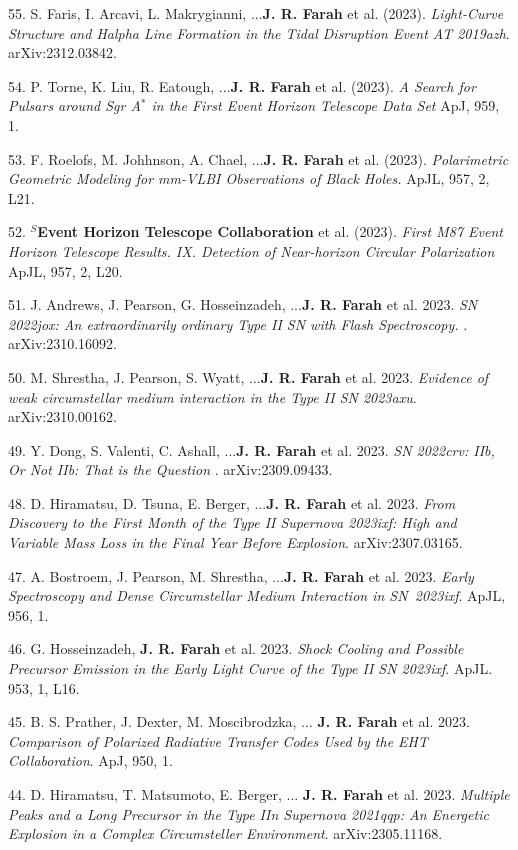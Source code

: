 \documentclass[margin,line]{res}
\begin{document}
\begin{resume}
55. S. Faris, I. Arcavi, L. Makrygianni, ...\textbf{J. R. Farah} et al. (2023). \textit{Light-Curve Structure and Halpha Line Formation in the Tidal Disruption Event AT 2019azh}. arXiv:2312.03842.

54. P. Torne, K. Liu, R. Eatough, ...\textbf{J. R. Farah} et al. (2023). \textit{ A Search for Pulsars around Sgr A$^\ast$ in the First Event Horizon Telescope Data Set } ApJ, 959, 1.

53. F. Roelofs, M. Johhnson, A. Chael, ...\textbf{J. R. Farah} et al. (2023). \textit{ Polarimetric Geometric Modeling for mm-VLBI Observations of Black Holes. } ApJL, 957, 2, L21.

52. \textbf{$^S$Event Horizon Telescope Collaboration} et al. (2023). \textit{First M87 Event Horizon Telescope Results. IX. Detection of Near-horizon Circular Polarization} ApJL, 957, 2, L20.

51. J. Andrews, J. Pearson, G. Hosseinzadeh, ...\textbf{J. R. Farah} et al. 2023. \textit{ SN 2022jox: An extraordinarily ordinary Type II SN with Flash Spectroscopy. }. arXiv:2310.16092.

50. M. Shrestha, J. Pearson, S. Wyatt, ...\textbf{J. R. Farah} et al. 2023. \textit{Evidence of weak circumstellar medium interaction in the Type II SN 2023axu}. arXiv:2310.00162.

49. Y. Dong, S. Valenti, C. Ashall, ...\textbf{J. R. Farah} et al. 2023. \textit{ SN 2022crv: IIb, Or Not IIb: That is the Question }. arXiv:2309.09433.

48. D. Hiramatsu, D. Tsuna, E. Berger, ...\textbf{J. R. Farah} et al. 2023. \textit{From Discovery to the First Month of the Type II Supernova 2023ixf: High and Variable Mass Loss in the Final Year Before Explosion}. arXiv:2307.03165.

47. A. Bostroem, J. Pearson, M. Shrestha, ...\textbf{J. R. Farah} et al. 2023. \textit{Early Spectroscopy and Dense Circumstellar Medium Interaction in SN~2023ixf}. ApJL, 956, 1.

46. G. Hosseinzadeh, \textbf{J. R. Farah} et al. 2023. \textit{Shock Cooling and Possible Precursor Emission in the Early Light Curve of the Type II SN 2023ixf}. ApJL. 953, 1, L16.  

45. B. S. Prather, J. Dexter, M. Moscibrodzka,  ... \textbf{J. R. Farah} et al. 2023. \textit{Comparison of Polarized Radiative Transfer Codes Used by the EHT Collaboration}. ApJ, 950, 1.

44. D. Hiramatsu, T. Matsumoto, E. Berger, ... \textbf{J. R. Farah} et al. 2023. \textit{Multiple Peaks and a Long Precursor in the Type IIn Supernova 2021qqp: An Energetic Explosion in a Complex Circumsteller Environment}. arXiv:2305.11168. 


\end{resume}
\end{document}
